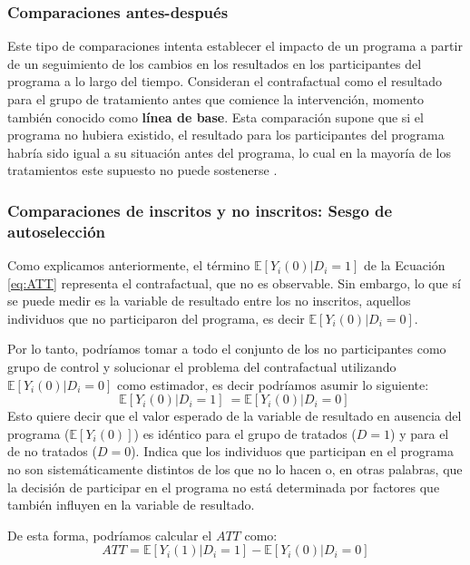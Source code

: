 \documentclass[../../main.tex]{subfiles}
\begin{document}
\subsubsection{Comparaciones antes-después}
Este tipo de comparaciones intenta establecer el impacto de un programa a partir de un seguimiento de los cambios en los resultados en los participantes del programa a lo largo del tiempo. Consideran el contrafactual como el resultado para el grupo de tratamiento antes que comience la intervención, momento también conocido como \textbf{línea de base}. Esta comparación supone que si el programa no hubiera existido, el resultado para los participantes del programa habría sido igual a su situación antes del programa, lo cual en la mayoría de los tratamientos este supuesto no puede sostenerse \cite{gertler-2016}.

\subsubsection{Comparaciones de inscritos y no inscritos: Sesgo de autoselección}
Como explicamos anteriormente, el término \(\mathbb{E} \left[Y_i(0)|D_i=1\right]\) de la Ecuación \ref{eq:ATT} representa el contrafactual, que no es observable. Sin embargo, lo que sí se puede medir es la variable de resultado entre los no inscritos, aquellos individuos que no participaron del programa, es decir \(\mathbb{E} \left[Y_i(0)|D_i=0\right]\).

Por lo tanto, podríamos tomar a todo el conjunto de los no participantes como grupo de control y solucionar el problema del contrafactual utilizando \(\mathbb{E} \left[Y_i(0)|D_i=0\right]\) como estimador, es decir podríamos asumir lo siguiente:  
\begin{equation}
    \mathbb{E} \left[Y_i(0)|D_i=1\right]\ = \mathbb{E} \left[Y_i(0)|D_i=0\right]\
    \label{eq:supuesto-1}  %
\end{equation}
Esto quiere decir que el valor esperado de la variable de resultado en ausencia del programa (\(\mathbb{E}\left[Y_i(0)\right]\)) es idéntico para el grupo de tratados (\(D = 1\)) y para el de no tratados (\(D = 0\)). Indica que los individuos que participan en el programa no son sistemáticamente distintos de los que no lo hacen \cite{bernal} o, en otras palabras, que la decisión de participar en el programa no está determinada por factores que también influyen en la variable de resultado.

De esta forma, podríamos calcular el \(ATT\) como:
\begin{equation}
    ATT = \mathbb{E} \left[Y_i(1)|D_i=1\right] - \mathbb{E} \left[Y_i(0)|D_i=0\right]
    \label{eq:ATT-con-supuesto-IC}
\end{equation}
\end{document}
